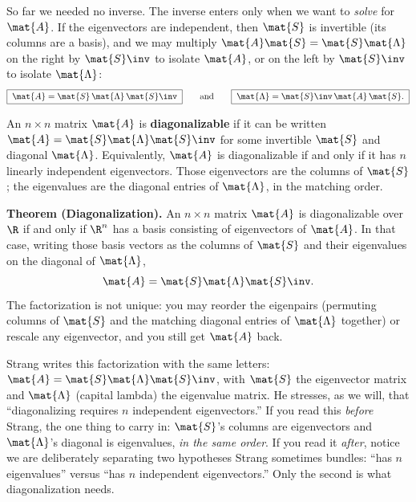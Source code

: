 So far we needed no inverse. The inverse enters only when we want to
\emph{solve} for $\mat{A}$. If the eigenvectors are independent, then $\mat{S}$ is
invertible (its columns are a basis), and we may multiply $\mat{A}\mat{S} =
\mat{S}\mat{\Lambda}$ on the right by $\mat{S}\inv$ to isolate $\mat{A}$, or on the
left by $\mat{S}\inv$ to isolate $\mat{\Lambda}$:
\[
  \boxed{\;\mat{A} = \mat{S}\,\mat{\Lambda}\,\mat{S}\inv\;}
  \qquad\text{and}\qquad
  \boxed{\;\mat{\Lambda} = \mat{S}\inv\,\mat{A}\,\mat{S}.\;}
\]

\begin{definition}
\label{ch24:def-diagonalizable}
An $n\times n$ matrix $\mat{A}$ is \textbf{diagonalizable} if it can be written
$\mat{A} = \mat{S}\mat{\Lambda}\mat{S}\inv$ for some invertible $\mat{S}$ and
diagonal $\mat{\Lambda}$. Equivalently, $\mat{A}$ is diagonalizable if and only
if it has $n$ linearly independent eigenvectors. Those eigenvectors are the
columns of $\mat{S}$; the eigenvalues are the diagonal entries of
$\mat{\Lambda}$, in the matching order.
\end{definition}

\begin{formalbox}
\textbf{Theorem (Diagonalization).} An $n\times n$ matrix $\mat{A}$ is
diagonalizable over $\R$ if and only if $\R^n$ has a basis consisting of
eigenvectors of $\mat{A}$. In that case, writing those basis vectors as the
columns of $\mat{S}$ and their eigenvalues on the diagonal of $\mat{\Lambda}$,
\[
  \mat{A} = \mat{S}\mat{\Lambda}\mat{S}\inv .
\]
The factorization is not unique: you may reorder the eigenpairs (permuting
columns of $\mat{S}$ and the matching diagonal entries of $\mat{\Lambda}$
together) or rescale any eigenvector, and you still get $\mat{A}$ back.
\end{formalbox}

\begin{strangbox}
Strang writes this factorization with the same letters: $\mat{A} =
\mat{S}\mat{\Lambda}\mat{S}\inv$, with $\mat{S}$ the eigenvector matrix and
$\mat{\Lambda}$ (capital lambda) the eigenvalue matrix. He stresses, as we will,
that ``diagonalizing requires $n$ independent eigenvectors.'' If you read this
\emph{before} Strang, the one thing to carry in: $\mat{S}$'s columns are
eigenvectors and $\mat{\Lambda}$'s diagonal is eigenvalues, \emph{in the same
order}. If you read it \emph{after}, notice we are deliberately separating two
hypotheses Strang sometimes bundles: ``has $n$ eigenvalues'' versus ``has $n$
independent eigenvectors.'' Only the second is what diagonalization needs.
\end{strangbox}

